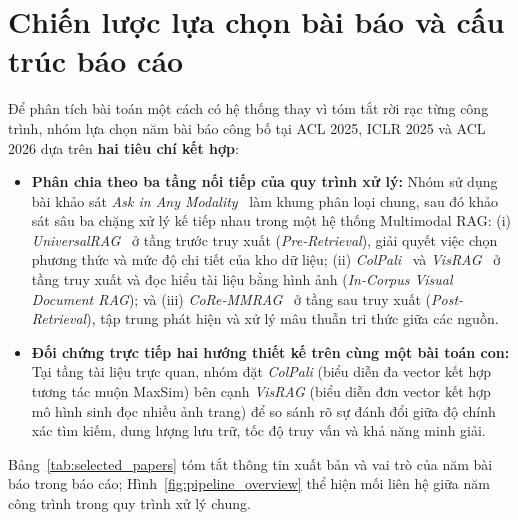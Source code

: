 \section{Chiến lược lựa chọn bài báo và cấu trúc báo cáo}
\label{sec:intro_strategy}

Để phân tích bài toán một cách có hệ thống thay vì tóm tắt rời rạc từng công trình, nhóm lựa chọn năm bài báo công bố tại ACL 2025, ICLR 2025 và ACL 2026 dựa trên \textbf{hai tiêu chí kết hợp}:

\begin{itemize}
    \item \textbf{Phân chia theo ba tầng nối tiếp của quy trình xử lý:} Nhóm sử dụng bài khảo sát \textit{Ask in Any Modality}~\cite{abootorabi2025ask} làm khung phân loại chung, sau đó khảo sát sâu ba chặng xử lý kế tiếp nhau trong một hệ thống Multimodal RAG: (i) \textit{UniversalRAG}~\cite{yeo2026universalrag} ở tầng trước truy xuất (\textit{Pre-Retrieval}), giải quyết việc chọn phương thức và mức độ chi tiết của kho dữ liệu; (ii) \textit{ColPali}~\cite{faysse2025colpali} và \textit{VisRAG}~\cite{yu2025visrag} ở tầng truy xuất và đọc hiểu tài liệu bằng hình ảnh (\textit{In-Corpus Visual Document RAG}); và (iii) \textit{CoRe-MMRAG}~\cite{tian2025coremmrag} ở tầng sau truy xuất (\textit{Post-Retrieval}), tập trung phát hiện và xử lý mâu thuẫn tri thức giữa các nguồn.
    \item \textbf{Đối chứng trực tiếp hai hướng thiết kế trên cùng một bài toán con:} Tại tầng tài liệu trực quan, nhóm đặt \textit{ColPali} (biểu diễn đa vector kết hợp tương tác muộn MaxSim) bên cạnh \textit{VisRAG} (biểu diễn đơn vector kết hợp mô hình sinh đọc nhiều ảnh trang) để so sánh rõ sự đánh đổi giữa độ chính xác tìm kiếm, dung lượng lưu trữ, tốc độ truy vấn và khả năng minh giải.
\end{itemize}

Bảng~\ref{tab:selected_papers} tóm tắt thông tin xuất bản và vai trò của năm bài báo trong báo cáo; Hình~\ref{fig:pipeline_overview} thể hiện mối liên hệ giữa năm công trình trong quy trình xử lý chung.

